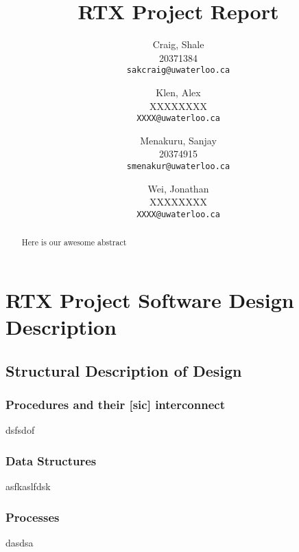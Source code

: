 \documentclass[12pt]{report}
\begin{document}

\title{RTX Project Report}

\author{
    Craig, Shale\\
    20371384\\
    \texttt{sakcraig@uwaterloo.ca}
    \and
    Klen, Alex\\
    XXXXXXXX\\
    \texttt{XXXX@uwaterloo.ca}
    \and
    Menakuru, Sanjay\\
    20374915\\
    \texttt{smenakur@uwaterloo.ca}
    \and
    Wei, Jonathan\\
    XXXXXXXX\\
    \texttt{XXXX@uwaterloo.ca}
}

\maketitle

\begin{abstract}
    Here is our awesome abstract
\end{abstract}

\tableofcontents


\part{RTX Project Software Design Description}
\chapter{Structural Description of Design}

\section{Procedures and their [sic] interconnect}
    dsfsdof

\section{Data Structures}
    asfkaslfdsk

\section{Processes}
    dasdsa
\end{document}
